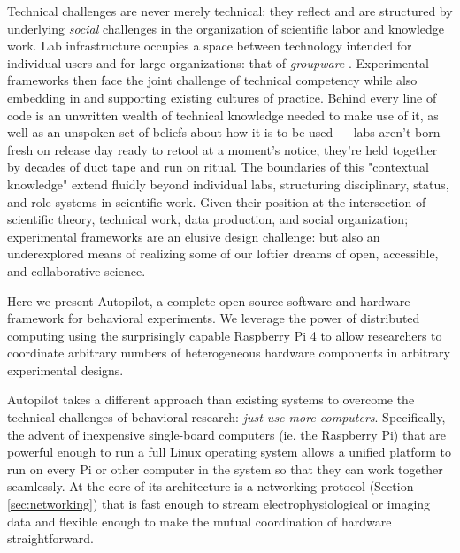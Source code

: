 Technical challenges are never merely technical: they reflect and are structured by underlying \textit{social} challenges in the organization of scientific labor and knowledge work. Lab infrastructure occupies a space between technology intended for individual users and for large organizations: that of \textit{groupware} \citep{johnson-lenzGroupwareCoiningDefining1998,johnson-lenzPostmechanisticGroupwarePrimitives1991}. Experimental frameworks then face the joint challenge of technical competency while also embedding in and supporting existing cultures of practice. Behind every line of code is an unwritten wealth of technical knowledge needed to make use of it, as well as an unspoken set of beliefs about how it is to be used --- labs aren't born fresh on release day ready to retool at a moment's notice, they're held together by decades of duct tape and run on ritual. The boundaries of this "contextual knowledge" extend fluidly beyond individual labs, structuring disciplinary, status, and role systems in scientific work\citep{barleyBackroomsScienceWork1994}. Given their position at the intersection of scientific theory, technical work, data production, and social organization; experimental frameworks are an elusive design challenge: but also an underexplored means of realizing some of our loftier dreams of open, accessible, and collaborative science. 

\vspace{12pt}

Here we present Autopilot, a complete open-source software and hardware framework for behavioral experiments. We leverage the power of distributed computing using the surprisingly capable Raspberry Pi 4 to allow researchers to coordinate arbitrary numbers of heterogeneous hardware components in arbitrary experimental designs.

Autopilot takes a different approach than existing systems to overcome the technical challenges of behavioral research: \textit{just use more computers}. Specifically, the advent of inexpensive single-board computers (ie. the Raspberry Pi) that are powerful enough to run a full Linux operating system allows a unified platform to run on every Pi or other computer in the system so that they can work together seamlessly. At the core of its architecture is a networking protocol (Section \ref{sec:networking}) that is fast enough to stream electrophysiological or imaging data and flexible enough to make the mutual coordination of hardware straightforward. 

